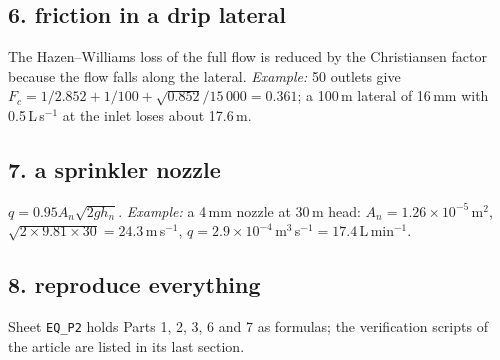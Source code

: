 \subsection{6. friction in a drip lateral}
The Hazen--Williams loss of the full flow is reduced by the Christiansen factor because the flow falls along the lateral. \emph{Example:} 50 outlets give $F_c=1/2.852+1/100+\sqrt{0.852}/15\,000=0.361$; a 100\,m lateral of 16\,mm with 0.5\,L\,s$^{-1}$ at the inlet loses about 17.6\,m.

\subsection{7. a sprinkler nozzle}
$q=0.95A_n\sqrt{2gh_n}$. \emph{Example:} a 4\,mm nozzle at 30\,m head: $A_n=1.26\times10^{-5}$\,m$^2$, $\sqrt{2\times9.81\times30}=24.3$\,m\,s$^{-1}$, $q=2.9\times10^{-4}$\,m$^3$\,s$^{-1}=17.4$\,L\,min$^{-1}$.

\subsection{8. reproduce everything}
Sheet \texttt{EQ\_P2} holds Parts 1, 2, 3, 6 and 7 as formulas; the verification scripts of the article are listed in its last section.

